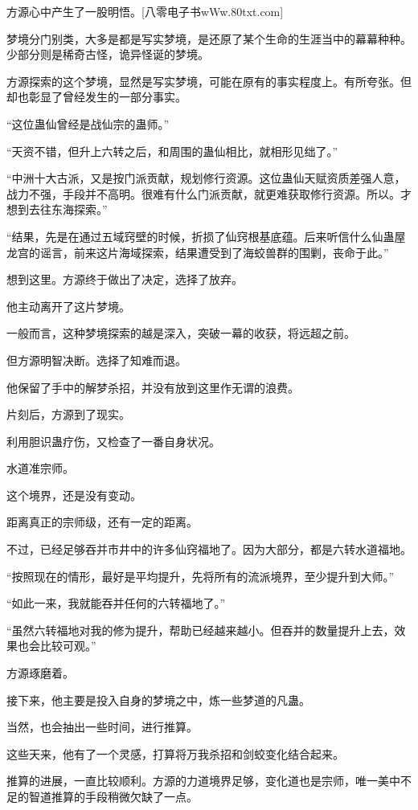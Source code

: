 \begin{this_body}
方源心中产生了一股明悟。[八零电子书wWw.80txt.com]

梦境分门别类，大多是都是写实梦境，是还原了某个生命的生涯当中的幕幕种种。少部分则是稀奇古怪，诡异怪诞的梦境。

方源探索的这个梦境，显然是写实梦境，可能在原有的事实程度上。有所夸张。但却也彰显了曾经发生的一部分事实。

“这位蛊仙曾经是战仙宗的蛊师。”

“天资不错，但升上六转之后，和周围的蛊仙相比，就相形见绌了。”

“中洲十大古派，又是按门派贡献，规划修行资源。这位蛊仙天赋资质差强人意，战力不强，手段并不高明。很难有什么门派贡献，就更难获取修行资源。所以。才想到去往东海探索。”

“结果，先是在通过五域窍壁的时候，折损了仙窍根基底蕴。后来听信什么仙蛊屋龙宫的谣言，前来这片海域探索，结果遭受到了海蛟兽群的围剿，丧命于此。”

想到这里。方源终于做出了决定，选择了放弃。

他主动离开了这片梦境。

一般而言，这种梦境探索的越是深入，突破一幕的收获，将远超之前。

但方源明智决断。选择了知难而退。

他保留了手中的解梦杀招，并没有放到这里作无谓的浪费。

片刻后，方源到了现实。

利用胆识蛊疗伤，又检查了一番自身状况。

水道准宗师。

这个境界，还是没有变动。

距离真正的宗师级，还有一定的距离。

不过，已经足够吞并市井中的许多仙窍福地了。因为大部分，都是六转水道福地。

“按照现在的情形，最好是平均提升，先将所有的流派境界，至少提升到大师。”

“如此一来，我就能吞并任何的六转福地了。”

“虽然六转福地对我的修为提升，帮助已经越来越小。但吞并的数量提升上去，效果也会比较可观。”

方源琢磨着。

接下来，他主要是投入自身的梦境之中，炼一些梦道的凡蛊。

当然，也会抽出一些时间，进行推算。

这些天来，他有了一个灵感，打算将万我杀招和剑蛟变化结合起来。

推算的进展，一直比较顺利。方源的力道境界足够，变化道也是宗师，唯一美中不足的智道推算的手段稍微欠缺了一点。


\end{this_body}
